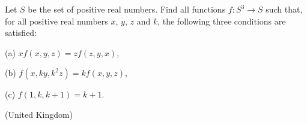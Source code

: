 Let $S$ be the set of positive real numbers. Find all functions $f\colon S^3 \to S$ such that, for all positive real numbers $x$,  $y$,  $z$ and $k$,  the following three conditions are satisfied:

(a) $xf(x,y,z) = zf(z,y,x)$, 

(b) $f(x, ky, k^2z) = kf(x,y,z)$, 

(c) $f(1, k, k+1) = k+1$.

(United Kingdom)